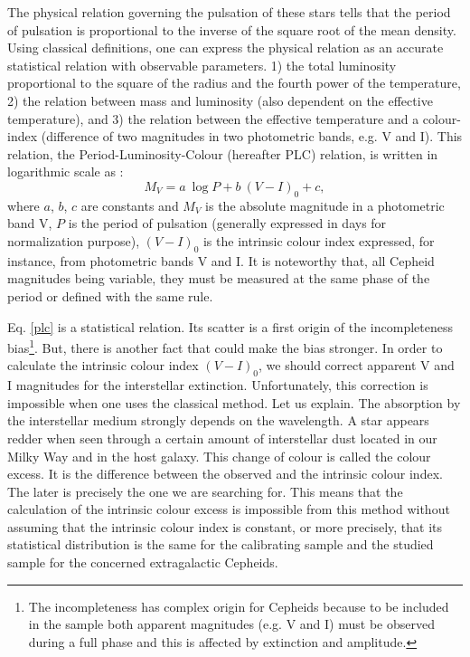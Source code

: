 The physical relation governing the pulsation of these stars tells that the period of pulsation is proportional to the inverse of the square root of the mean density. Using classical definitions, one can express the physical relation as an accurate statistical relation with observable parameters. 1) the total luminosity proportional to the square of the radius and the fourth power of the temperature, 2) the relation between mass and luminosity (also dependent on the effective temperature), and 3) the relation between the effective temperature and a colour-index (difference of  two magnitudes in two photometric bands, e.g. V and I). This relation, the Period-Luminosity-Colour (hereafter PLC) relation, is written in logarithmic scale as :
\begin{equation}
M_V = a \ \log P + b \ (V-I)_0 + c ,
\label{plc}
\end{equation}
where $a$, $b$, $c$ are constants and $M_V$ is the absolute magnitude in a photometric band V, $P$ is the period of pulsation (generally expressed in days for normalization purpose), $(V-I)_0$  is the intrinsic colour index expressed, for instance, from photometric bands V and I. It is noteworthy  that, all Cepheid magnitudes being variable, they must be measured at the same phase of the period or defined with the same rule.

 Eq. \ref{plc} is a statistical relation. Its scatter is a first origin of the incompleteness  bias\footnote{The incompleteness has complex origin for Cepheids because to be included in the sample both apparent magnitudes (e.g. V and I)  must be observed during a full phase and this is affected by extinction and amplitude.}. But, there is another fact that could make the bias stronger. 
In order to calculate the intrinsic colour index $(V-I)_0$, we should correct  apparent V and I magnitudes for the interstellar extinction. Unfortunately, this correction is impossible when one uses the classical method. Let us explain.
The absorption by the interstellar medium strongly depends on the wavelength. A star appears redder when seen through a certain amount of interstellar dust located in our Milky Way and in the host galaxy.  This change of colour is called the colour excess. It is the difference between the observed and the intrinsic colour index. The later is precisely the one we are searching for. This means that the calculation of the intrinsic colour excess is impossible from this method without assuming that the intrinsic colour index is constant, or more precisely, that its statistical distribution is the same for the calibrating sample and the studied sample for the concerned extragalactic Cepheids.

